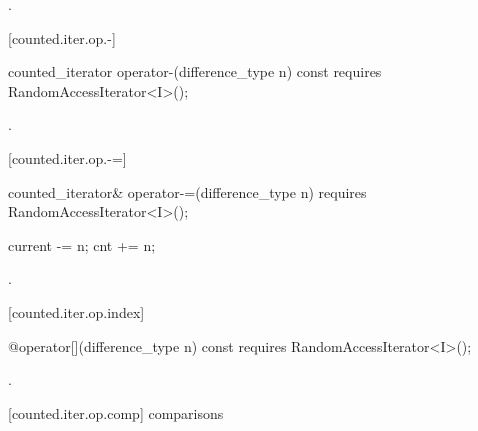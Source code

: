 \begin{addedblock}
\begin{itemdescr}
\pnum
\returns {}.
\end{itemdescr}

[counted.iter.op.-]{}

%
%
\begin{itemdecl}
  counted_iterator operator-(difference_type n) const
    requires RandomAccessIterator<I>();
\end{itemdecl}

\begin{itemdescr}
\pnum
\requires {}

\pnum
\returns {}.
\end{itemdescr}

[counted.iter.op.-=]{}

%
%
\begin{itemdecl}
  counted_iterator& operator-=(difference_type n)
    requires RandomAccessIterator<I>();
\end{itemdecl}

\begin{itemdescr}
\pnum
\requires {}

\pnum
\effects
\begin{codeblock}
current -= n;
cnt += n;
\end{codeblock}

\pnum
\returns {}.
\end{itemdescr}

[counted.iter.op.index]{}

%
%
\begin{itemdecl}
  @\unspec@ operator[](difference_type n) const
    requires RandomAccessIterator<I>();
\end{itemdecl}

\begin{itemdescr}
\pnum
\requires {}

\pnum
\returns {}.
\end{itemdescr}

[counted.iter.op.comp]{ comparisons}


\end{addedblock}
